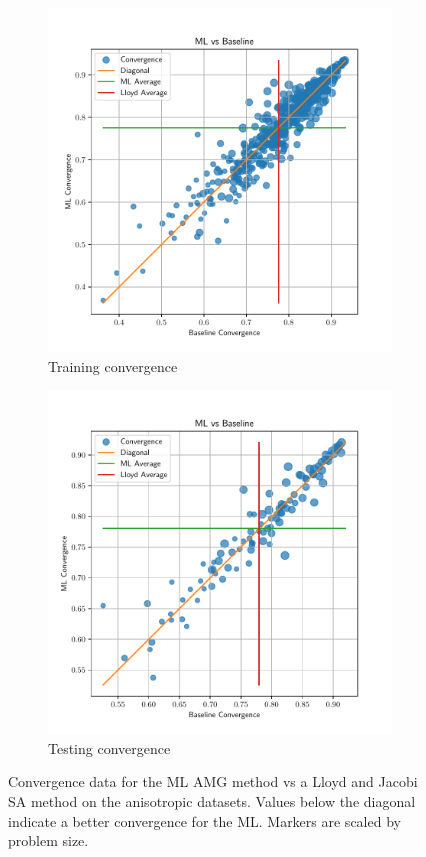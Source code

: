 \documentclass{article}
\begin{document}
\begin{figure}[!hb]
  \centering
  \begin{subfigure}[t]{0.49\textwidth}
    \centering
    \includegraphics[width=\textwidth]{aniso3d_train_baseline_ml_convergence.pdf}
    \caption{Training convergence}
  \end{subfigure}
  \begin{subfigure}[t]{0.49\textwidth}
    \centering
    \includegraphics[width=\textwidth]{aniso3d_test_baseline_ml_convergence.pdf}
    \caption{Testing convergence}
  \end{subfigure}
  \caption{Convergence data for the ML AMG method vs a Lloyd and Jacobi SA method on the anisotropic datasets.  Values below the diagonal indicate a better convergence for the ML.  Markers are scaled by problem size.}
  \label{fig:aniso_conv}
\end{figure}
\end{document}
